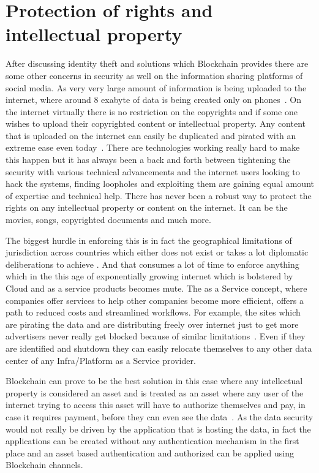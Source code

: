 \section{Protection of rights and intellectual property}

After discussing identity theft and solutions which Blockchain
provides there are some other concerns in security as well on the
information sharing platforms of social media. As very very large
amount of information is being uploaded to the internet, where around
8 exabyte of data is being created only on phones~\cite{jeff26}. On
the internet virtually there is no restriction on the copyrights and if
some one wishes to upload their copyrighted content or intellectual
property. Any content that is uploaded on the internet can easily be
duplicated and pirated with an extreme ease even today~\cite{anita27}.
There are technologies working really hard to make this happen but it
has always been a back and forth between tightening the security with
various technical advancements and the internet users looking to hack
the systems, finding loopholes and exploiting them are gaining equal
amount of expertise and technical help. There has never been a robust
way to protect the rights on any intellectual property or content on
the internet. It can be the movies, songs, copyrighted documents and
much more.

The biggest hurdle in enforcing this is in fact the geographical
limitations of jurisdiction across countries which either does not
exist or takes a lot diplomatic deliberations to achieve
\cite{anita27}. And that consumes a lot of time to enforce anything
which in the this age of exponentially growing internet which is
bolstered by Cloud and as a service products becomes mute. The as a
Service concept, where companies offer services to help other
companies  become more efficient, offers a path to reduced costs and
streamlined workflows. For example, the sites which are pirating the
data and are distributing freely over internet just to get more
advertisers never really get blocked because of similar
limitations~\cite{ian28}. Even if they are identified and shutdown
they can easily relocate themselves to any other data center of any
Infra/Platform as a Service provider. 

Blockchain can prove to be the best solution in this case where any
intellectual property is considered an asset and is treated as an
asset where any user of the internet trying to access this asset will
have to authorize themselves and pay, in case it requires payment,
before they can even see the data~\cite{bitcoinist29}. As the data
security would not really be driven by the application that is hosting
the data, in fact the applications can be created without any
authentication mechanism in the first place and an asset based
authentication and authorized can be applied using Blockchain
channels.



